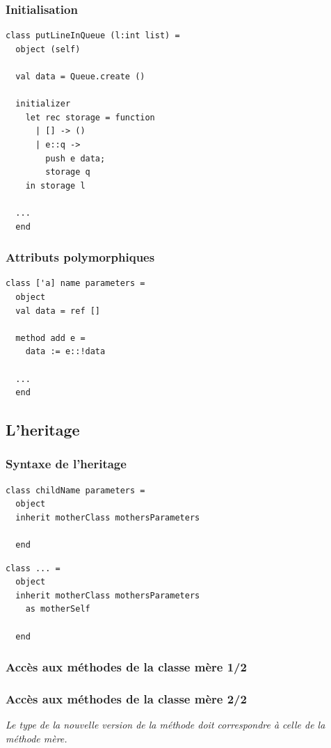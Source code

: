 \begin{frame}[fragile]
	\frametitle{Initialisation}
	\begin{lstlisting}
class putLineInQueue (l:int list) =
  object (self)
    
  val data = Queue.create ()

  initializer
    let rec storage = function
      | [] -> ()
      | e::q -> 
        push e data;
        storage q
    in storage l

  ...
  end
	\end{lstlisting}
\end{frame}

\begin{frame}[fragile]
	\frametitle{Attributs polymorphiques}
	\begin{lstlisting}
class ['a] name parameters =
  object 
  val data = ref []

  method add e =
    data := e::!data
  
  ...
  end
	\end{lstlisting}
\end{frame}

\subsection{L'heritage} %
\begin{frame}[fragile]
	\frametitle{Syntaxe de l'heritage}
	\begin{lstlisting}
class childName parameters =
  object
  inherit motherClass mothersParameters

  end
	\end{lstlisting}
	\begin{lstlisting}
class ... =
  object
  inherit motherClass mothersParameters 
    as motherSelf

  end
	\end{lstlisting}
\end{frame}

\begin{frame}
	\frametitle{Accès aux méthodes de la classe mère 1/2}
	
\end{frame}

\begin{frame}
	\frametitle{Accès aux méthodes de la classe mère 2/2}
	\textit{Le type de la nouvelle version de la méthode doit correspondre à celle de la méthode mère.}
	
\end{frame}
